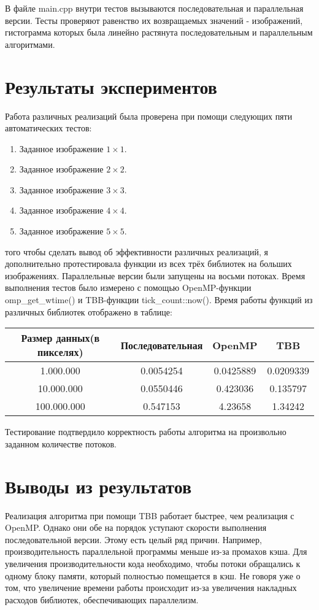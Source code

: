 \documentclass[14pt, russian]{extarticle}
\begin{document}
    В файле main.cpp внутри тестов вызываются последовательная и параллельная версии. Тесты проверяют равенство их возвращаемых значений - изображений, гистограмма которых была линейно растянута последовательным и параллельным алгоритмами.
	\newpage
	
	\section{Результаты экспериментов}
	Работа различных реализаций была проверена при помощи следующих пяти автоматических тестов:
	\begin{enumerate}[topsep=0pt, labelwidth=!, labelindent=0pt]
		\item Заданное изображение $1 \times 1$.
		\item Заданное изображение $2 \times 2$.
		\item Заданное изображение $3 \times 3$.
		\item Заданное изображение $4 \times 4$.
		\item Заданное изображение $5 \times 5$.
	\end{enumerate}
	
	 того чтобы сделать вывод об эффективности различных реализаций, я дополнительно протестировала функции из всех трёх библиотек на больших изображениях. Параллельные версии были запущены на восьми потоках. Время выполнения тестов было измерено с помощью OpenMP-функции omp\_get\_wtime() и TBB-функции tick\_count::now(). Время работы функций из различных библиотек отображено в таблице:
	
	\begin{table}[ht]
		\centering
		\begin{tabular}{| c | c | c | c |}
			\hline
			Размер данных(в пикселях) & Последовательная & OpenMP & TBB \\
			\hline
			1{.}000{.}000 & 0.0054254  & 0.0425889 & 0.0209339 \\
			\hline
			10{.}000{.}000 & 0.0550446 & 0.423036 & 0.135797  \\
			\hline
			100{.}000{.}000 & 0.547153 &  4.23658 & 1.34242 \\
			\hline
		\end{tabular}
	\end{table}

	Тестирование подтвердило корректность работы алгоритма на произвольно заданном количестве потоков.
	\newpage
	
	\section{Выводы из результатов}
	Реализация алгоритма при помощи TBB работает быстрее, чем реализация с OpenMP. Однако они обе на порядок уступают скорости выполнения последовательной версии. Этому есть целый ряд причин. Например, производительность параллельной программы меньше из-за промахов кэша. Для увеличения производительности кода необходимо, чтобы потоки обращались к одному блоку памяти, который полностью помещается в кэш. Не говоря уже о том, что увеличение времени работы происходит из-за увеличения накладных расходов библиотек, обеспечивающих параллелизм.
	\newpage
	
\end{document}
